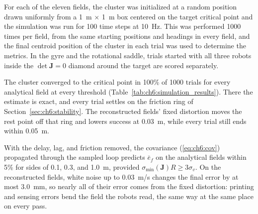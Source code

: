 For each of the eleven fields, the cluster was initialized at a random position drawn uniformly from a 1~m $\times$ 1~m box centered on the target critical point and the simulation was run for 100 time steps at 10~Hz. This was performed 1000 times per field, from the same starting positions and headings in every field, and the final centroid position of the cluster in each trial was used to determine the metrics. In the gyre and the rotational saddle, trials started with all three robots inside the $\det\mathbf{J} = 0$ diamond around the target are scored separately.

 The cluster converged to the critical point in 100\% of 1000 trials for every analytical field at every threshold (Table~\ref{tab:ch6:simulation_results}). There the estimate is exact, and every trial settles on the friction ring of Section~\ref{sec:ch6:stability}. The reconstructed fields' fixed distortion moves the rest point off that ring and lowers success at 0.03~m, while every trial still ends within 0.05~m.

With the delay, lag, and friction removed, the covariance (\ref{eq:ch6:cov}) propagated through the sampled loop predicts $\bar{e}_f$ on the analytical fields within 5\% for sides of 0.1, 0.3, and 1.0~m, provided $\sigma_{\min}(\mathbf{J})R \ge 3\sigma_v$. On the reconstructed fields, white noise up to 0.03~m/s changes the final error by at most 3.0~mm, so nearly all of their error comes from the fixed distortion: printing and sensing errors bend the field the robots read, the same way at the same place on every pass.

